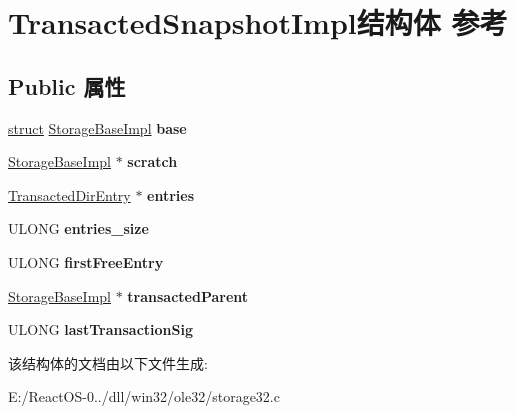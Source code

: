 \hypertarget{struct_transacted_snapshot_impl}{}\section{Transacted\+Snapshot\+Impl结构体 参考}
\label{struct_transacted_snapshot_impl}
\subsection*{Public 属性}
\begin{DoxyCompactItemize}
\item 
\mbox{\label{struct_transacted_snapshot_impl_abfd83322e97b71dc208f3fb6751d9310}} 
\hyperlink{interfacestruct}{struct} \hyperlink{struct_storage_base_impl}{Storage\+Base\+Impl} {\bfseries base}
\item 
\mbox{\label{struct_transacted_snapshot_impl_a8df368f3ec11b92dc161c08f48e4b160}} 
\hyperlink{struct_storage_base_impl}{Storage\+Base\+Impl} $\ast$ {\bfseries scratch}
\item 
\mbox{\label{struct_transacted_snapshot_impl_a11465aa9b26fbc1a2127b1a092d0c59c}} 
\hyperlink{struct_transacted_dir_entry}{Transacted\+Dir\+Entry} $\ast$ {\bfseries entries}
\item 
\mbox{\label{struct_transacted_snapshot_impl_aec774e19360dce5fbfe7a619edda5ca3}} 
U\+L\+O\+NG {\bfseries entries\+\_\+size}
\item 
\mbox{\label{struct_transacted_snapshot_impl_a8b8218d957eac168a70550fed34e88f9}} 
U\+L\+O\+NG {\bfseries first\+Free\+Entry}
\item 
\mbox{\label{struct_transacted_snapshot_impl_a9327a9ddee99e1075bec071895af85f0}} 
\hyperlink{struct_storage_base_impl}{Storage\+Base\+Impl} $\ast$ {\bfseries transacted\+Parent}
\item 
\mbox{\label{struct_transacted_snapshot_impl_a942b77579621cdd3b08f92b272a5b090}} 
U\+L\+O\+NG {\bfseries last\+Transaction\+Sig}
\end{DoxyCompactItemize}


该结构体的文档由以下文件生成\+:\begin{DoxyCompactItemize}
\item 
E\+:/\+React\+O\+S-\/0../dll/win32/ole32/storage32.\+c\end{DoxyCompactItemize}
